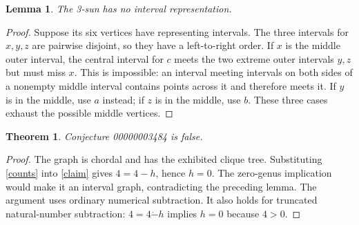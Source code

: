 \documentclass[11pt]{article}
\newtheorem{theorem}{Theorem}
\newtheorem{lemma}{Lemma}
\begin{document}
\begin{lemma}
The 3-sun has no interval representation.
\end{lemma}
\begin{proof}
Suppose its six vertices have representing intervals. The three intervals for $x,y,z$ are pairwise disjoint, so they have a left-to-right order. If $x$ is the middle outer interval, the central interval for $c$ meets the two extreme outer intervals $y,z$ but must miss $x$. This is impossible: an interval meeting intervals on both sides of a nonempty middle interval contains points across it and therefore meets it. If $y$ is in the middle, use $a$ instead; if $z$ is in the middle, use $b$. These three cases exhaust the possible middle vertices.
\end{proof}
\begin{theorem}
Conjecture 00000003484 is false.
\end{theorem}
\begin{proof}
The graph is chordal and has the exhibited clique tree. Substituting \eqref{counts} into \eqref{claim} gives $4=4-h$, hence $h=0$. The zero-genus implication would make it an interval graph, contradicting the preceding lemma. The argument uses ordinary numerical subtraction. It also holds for truncated natural-number subtraction: $4=4\mathbin{\dot-}h$ implies $h=0$ because $4>0$.
\end{proof}
\end{document}
